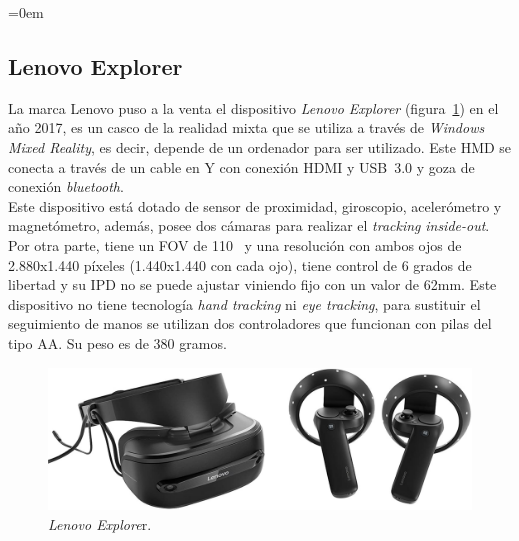 \parindent=0em
\subsection{Lenovo Explorer}
\noindent

La marca Lenovo puso a la venta el dispositivo \textit{Lenovo Explorer} (figura~\ref{fig:lenovoExplorer}) en el año 2017, es un casco de la realidad mixta que se utiliza a través de \textit{Windows Mixed Reality}, es decir, depende de un ordenador para ser utilizado. Este HMD se conecta a través de un cable en Y con conexión HDMI y USB~3.0 y goza de conexión \textit{bluetooth}.\\

Este dispositivo está dotado de sensor de proximidad, giroscopio, acelerómetro y magnetómetro, además, posee dos cámaras para realizar el \textit{tracking} \textit{inside-out}.\\

Por otra parte, tiene un FOV de 110\degree~  y una resolución con ambos ojos de 2.880x1.440 píxeles (1.440x1.440 con cada ojo), tiene control de 6 grados de libertad  y su IPD no se puede ajustar viniendo fijo con un valor de 62mm. Este dispositivo no tiene tecnología \textit{hand tracking} ni \textit{eye tracking}, para sustituir el seguimiento de manos se utilizan dos controladores que funcionan con pilas del tipo AA. Su peso es de 380 gramos. 



\begin{figure}[H]
    \centering
    \includegraphics[scale=0.2]{Images/Estado del arte/lenovoexplorer.jpg}
    \caption[Lenovo Explore]{\textit{Lenovo Explore}r\footnotemark.}
    \label{fig:lenovoExplorer}
\end{figure}

